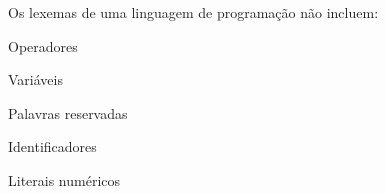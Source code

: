 \question[10]

Os lexemas de uma linguagem de programação não incluem:

\begin{choices}
\item Operadores
\item Variáveis %
\item Palavras reservadas
\item Identificadores
\item Literais numéricos
\end{choices}
\answerline

